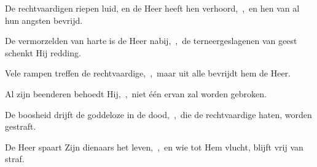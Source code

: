 \documentclass[12pt,twoside,a5paper]{article}
\begin{document}
\begin{halfparskip}
  De rechtvaardigen riepen luid, en de Heer heeft hen verhoord,~\sep\ en hen van al hun angsten bevrijd.

  De vermorzelden van harte is de Heer nabij,~\sep\ de terneergeslagenen van geest schenkt Hij redding.

  Vele rampen treffen de rechtvaardige,~\sep\ maar uit alle bevrijdt hem de Heer.

  Al zijn beenderen behoedt Hij,~\sep\ niet één ervan zal worden gebroken.

  De boosheid drijft de goddeloze in de dood,~\sep\ die de rechtvaardige haten, worden gestraft.

  De Heer spaart Zijn dienaars het leven,~\sep\ en wie tot Hem vlucht, blijft vrij van straf.
\end{halfparskip}

\end{document}
